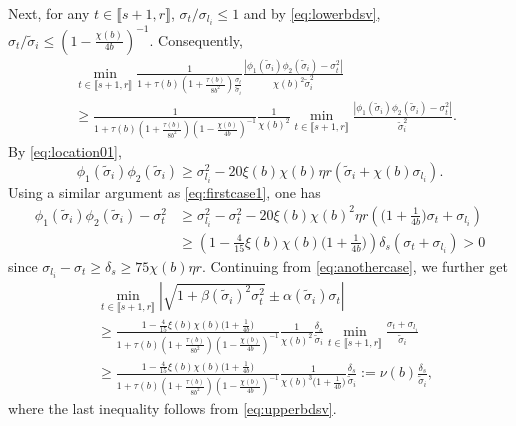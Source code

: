 \documentclass[reqno]{amsart}
\theoremstyle{plain}
\theoremstyle{definition}
\begin{document}
Next, for any $t\in \llbracket s+1, r\rrbracket$, $\sigma_t/\sigma_{l_i} \le 1$ and by \eqref{eq:lowerbdsv}, $\sigma_t/{\widetilde \sigma_i} \le \left( 1-\frac{\chi(b)}{4b} \right)^{-1}.$ Consequently, 
\begin{align}\label{eq:anothercase}
&\min_{t\in  \llbracket s+1, r\rrbracket}\frac{1}{1+\tau(b)\left(1 +\frac{\tau(b)}{8b^2} \right)\frac{\sigma_t}{\widetilde \sigma_i}
} \frac{|\phi_1(\widetilde\sigma_i)\phi_2(\widetilde\sigma_i)-\sigma_t^2|}{ \chi(b)^2\widetilde\sigma_i^2} \nonumber\\
&\ge \frac{1}{1+\tau(b)\left(1 +\frac{\tau(b)}{8b^2} \right)\left( 1-\frac{\chi(b)}{4b} \right)^{-1}}\frac{1}{\chi(b)^2}\min_{t\in \llbracket s+1, r\rrbracket} \frac{|\phi_1(\widetilde\sigma_i)\phi_2(\widetilde\sigma_i)-\sigma_t^2|}{\widetilde\sigma_i^2}.
\end{align}
By \eqref{eq:location01}, $$\phi_1(\widetilde\sigma_i)\phi_2(\widetilde\sigma_i) \ge \sigma_{l_i}^2 -20\xi(b)\chi(b)\eta r(\widetilde \sigma_i +\chi(b)\sigma_{l_i}).$$
Using a similar argument as \eqref{eq:firstcase1}, one has
\begin{align*}
\phi_1(\widetilde\sigma_i)\phi_2(\widetilde\sigma_i)-\sigma_t^2 &\ge  \sigma_{l_i}^2 - \sigma_t^2  -20\xi(b)\chi(b)^2 \eta r \left(\big(1+\frac{1}{4b}\big) \sigma_t + \sigma_{l_i}\right)\\
&\ge \left( 1- \frac{4}{15}\xi(b)\chi(b)\big(1+\frac{1}{4b}\big) \right) \delta_s (\sigma_t + \sigma_{l_i})>0
\end{align*}
since $\sigma_{l_i} - \sigma_t \ge \delta_{s} \ge 75\chi(b)\eta r$. %
Continuing from \eqref{eq:anothercase}, we further get
\begin{align*}%
&\min_{t\in  \llbracket s+1, r\rrbracket} \left| \sqrt{1+\beta(\widetilde \sigma_i)^2 \sigma_t^2} \pm \alpha(\widetilde \sigma_i) \sigma_t \right| \nonumber\\
&\ge \frac{1- \frac{4}{15}\xi(b)\chi(b)\big(1+\frac{1}{4b}\big)}{1+\tau(b)\left(1 +\frac{\tau(b)}{8b^2} \right)\left( 1-\frac{\chi(b)}{4b} \right)^{-1}}\frac{1}{\chi(b)^2}\frac{\delta_s}{\widetilde \sigma_i}\min_{t\in \llbracket s+1, r\rrbracket} \frac{\sigma_t + \sigma_{l_i}}{\widetilde\sigma_i}\nonumber\\
&\ge \frac{1- \frac{4}{15}\xi(b)\chi(b)\big(1+\frac{1}{4b}\big)}{1+\tau(b)\left(1 +\frac{\tau(b)}{8b^2} \right)\left( 1-\frac{\chi(b)}{4b} \right)^{-1}}\frac{1}{\chi(b)^3 \big(1+\frac{1}{4b}\big)}\frac{\delta_s}{\widetilde \sigma_i}:=\nu(b) \frac{\delta_s}{\widetilde \sigma_i},
\end{align*}
where the last inequality follows from \eqref{eq:upperbdsv}. 
\end{document}
